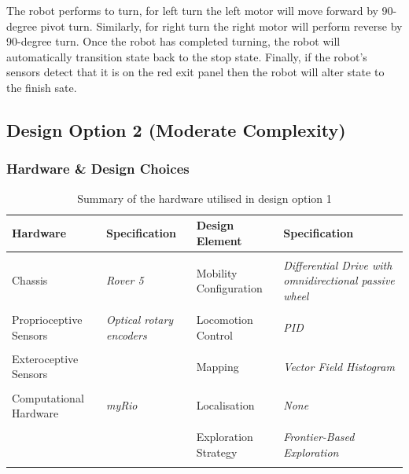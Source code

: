 \documentclass[a4paper]{article}
\begin{document}
The robot performs to turn, for left turn the left motor will move forward by 90-degree pivot turn. Similarly, for right turn the right motor will perform reverse by 90-degree turn. Once the robot has completed turning, the robot will automatically transition state back to the stop state. Finally, if the robot’s sensors detect that it is on the red exit panel then the robot will alter state to the finish sate.

\subsection{Design Option 2 (Moderate Complexity)}
\subsubsection{Hardware \& Design Choices}
\begin{table}[h]
\centering
\caption{Summary of the hardware utilised in design option 1}\footnotesize
\begin{tabular}{p{3.5cm}p{3.8cm}p{3.5cm}p{3.8cm}}
\toprule
\textbf{Hardware} & \textbf{Specification} & \textbf{Design Element} & \textbf{Specification}\\
\midrule
& & &\\
Chassis  & \textit{Rover 5} & Mobility Configuration & \textit{Differential Drive with omnidirectional passive wheel}\\
& & &\\
Proprioceptive Sensors & \textit{Optical rotary encoders} & Locomotion Control & \textit{PID}\\
& & &\\
Exteroceptive Sensors & & Mapping & \textit{Vector Field Histogram}\\
& & & \\
Computational Hardware & \textit{myRio} & Localisation & \textit{None} \\
& & & \\
 & & Exploration Strategy & \textit{Frontier-Based Exploration}\\
& & & \\
\bottomrule
\end{tabular}
\end{table}
\end{document}
